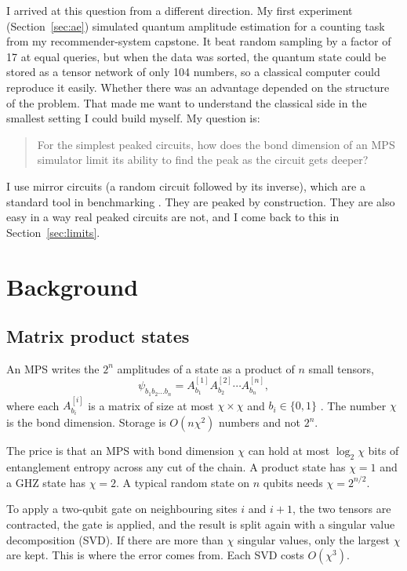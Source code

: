 \documentclass[11pt,a4paper]{article}
\begin{document}
I arrived at this question from a different direction. My first experiment
(Section~\ref{sec:ae}) simulated quantum amplitude estimation for a counting task from my
recommender-system capstone. It beat random sampling by a factor of 17 at equal queries, but
when the data was sorted, the quantum state could be stored as a tensor network of only 104
numbers, so a classical computer could reproduce it easily. Whether there was an advantage
depended on the structure of the problem. That made me want to understand the classical side
in the smallest setting I could build myself. My question is:

\begin{quote}
For the simplest peaked circuits, how does the bond dimension of an MPS simulator limit its
ability to find the peak as the circuit gets deeper?
\end{quote}

I use mirror circuits (a random circuit followed by its inverse), which are a standard tool
in benchmarking \cite{proctor2022}. They are peaked by construction. They are also easy in a
way real peaked circuits are not, and I come back to this in Section~\ref{sec:limits}.

\section{Background}

\subsection{Matrix product states}

An MPS writes the $2^n$ amplitudes of a state as a product of $n$ small tensors,
\begin{equation}
\psi_{b_1 b_2 \dots b_n} = A^{[1]}_{b_1} A^{[2]}_{b_2} \cdots A^{[n]}_{b_n},
\end{equation}
where each $A^{[i]}_{b_i}$ is a matrix of size at most $\chi\times\chi$ and $b_i\in\{0,1\}$
\cite{vidal2003,schollwock2011}. The number $\chi$ is the bond dimension. Storage is
$O(n\chi^2)$ numbers and not $2^n$.

The price is that an MPS with bond dimension $\chi$ can hold at most $\log_2\chi$ bits of
entanglement entropy across any cut of the chain. A product state has $\chi=1$ and a GHZ
state has $\chi=2$. A typical random state on $n$ qubits needs $\chi=2^{n/2}$.

To apply a two-qubit gate on neighbouring sites $i$ and $i+1$, the two tensors are
contracted, the gate is applied, and the result is split again with a singular value
decomposition (SVD). If there are more than $\chi$ singular values, only the largest $\chi$
are kept. This is where the error comes from. Each SVD costs $O(\chi^3)$.
\end{document}
